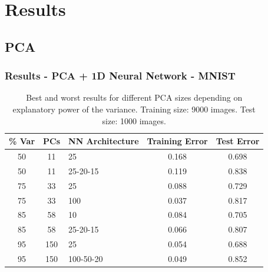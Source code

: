 \documentclass{beamer}
\begin{document}
\section{Results}

\subsection{PCA}

\begin{frame}
\frametitle{Results - PCA + 1D Neural Network - MNIST}
\begin{table}[hbt]
  \begin{tabular}{|cc|l|c|c|}
  	\hline
    \% Var & PCs & NN Architecture & Training Error & Test Error \\
    \hline
    \hline
    50 & 11 & 25 & 0.168   &  0.698 \\
    50 & 11 & 25-20-15 & 0.119  &   0.838  \\
    \hline
    75 & 33 & 25 & 0.088  &   0.729 \\
    75 & 33 & 100 &    0.037  &   0.817\\
    \hline
    85 & 58 & 10 & 0.084  &   0.705\\
    85 & 58 & 25-20-15 & 0.066  &   0.807\\
    \hline
    95 & 150 & 25 &  0.054   &  0.688\\
    95 & 150 & 100-50-20 & 0.049   &  0.852\\
    \hline
  \end{tabular}
  \vspace{1em}
  \caption{Best and worst results for different PCA sizes depending on explanatory power of the variance. Training size: 9000 images. Test size: 1000 images.}
\end{table}
\end{frame}
\end{document}
